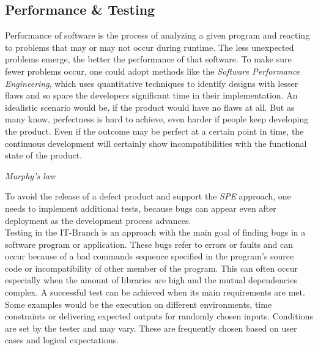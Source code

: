 \subsection{Performance \& Testing}
Performance of software is the process of analyzing a given program and reacting to problems that may or may not occur during runtime. The less unexpected problems emerge, the better the performance of that software\cite{8432081}. 
To make sure fewer problems occur, one could adopt methods like the \textit{Software Performance Engineering}, which uses quantitative techniques to identify designs with lesser flaws and so spare the developers significant time in their implementation\cite{4299916}. An idealistic scenario would be, if the product would have no flaws at all. But as many know, perfectness is hard to achieve, even harder if people keep developing the product. Even if the outcome may be perfect at a certain point in time, the continuous development will certainly show incompatibilities with the functional state of the product.
\begin{center}
	\begin{flushright}
		\textit{Murphy's law}
	\end{flushright}
\end{center}
To avoid the release of a defect product and support the \textit{SPE} approach, one needs to implement additional tests, because bugs can appear even after deployment as the development process advances.\\
Testing in the IT-Branch is an approach with the main goal of finding bugs in a software program or application. These bugs refer to errors or faults and can occur because of a bad commands sequence specified in the program's source code or incompatibility of other member of the program. This can often occur especially when the \dq amount of libraries are high and the mutual dependencies complex\dq{}\cite{7302456}. A successful test can be achieved when its main requirements are met. Some examples would be the execution on different environments, time constraints or delivering expected outputs for randomly chosen inputs. Conditions are set by the tester and may vary. These are frequently chosen based on user cases and logical expectations.
